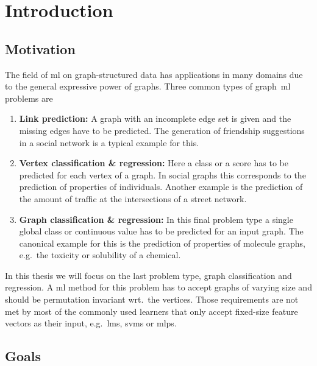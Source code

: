 \chapter{Introduction}%
\label{sec:intro}

\setcounter{page}{1}			%

\section{Motivation}%
\label{sec:intro:motivation}

The field of \ac{ml} on graph-structured data has applications in many domains due to the general expressive power of graphs.
Three common types of graph~\ac{ml} problems are
\begin{enumerate}[label=\textbf{\arabic*.}]
	\item \textbf{Link prediction:}
		A graph with an incomplete edge set is given and the missing edges have to be predicted.
		The generation of friendship suggestions in a social network is a typical example for this.
	\item \textbf{Vertex classification \& regression:}
		Here a class or a score has to be predicted for each vertex of a graph.
		In social graphs this corresponds to the prediction of properties of individuals.
		Another example is the prediction of the amount of traffic at the intersections of a street network.
	\item \textbf{Graph classification \& regression:}
		In this final problem type a single global class or continuous value has to be predicted for an input graph.
		The canonical example for this is the prediction of properties of molecule graphs, e.g.\ the toxicity or solubility of a chemical.
\end{enumerate}
In this thesis we will focus on the last problem type, graph classification and regression.
A \ac{ml} method for this problem has to accept graphs of varying size and should be permutation invariant wrt.\ the vertices.
Those requirements are not met by most of the commonly used learners that only accept fixed-size feature vectors as their input, e.g.\ \acp{lm}, \acp{svm} or \acp{mlp}.

\section{Goals}%
\label{sec:intro:goals}

